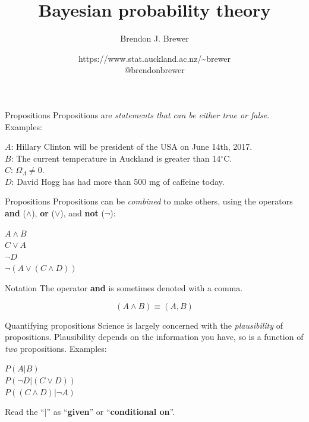 \documentclass{beamer}
\author{Brendon J. Brewer}
\title{Bayesian probability theory}
\institute{Department of Statistics, The University of Auckland}
\date{{\color{blue} https://www.stat.auckland.ac.nz/\~{ }brewer}\\
\vspace{10pt}
{\color{blue} @brendonbrewer}}
\begin{document}
\begin{frame}[t,plain]
\titlepage
\end{frame}

\begin{frame}[t]{Propositions}
Propositions are {\it statements that can be either true or false}.\\
Examples:\vspace{20pt}

$A$: {\small Hillary Clinton will be president of the USA on June 14th, 2017.}\\
$B$: {\small The current temperature in Auckland is greater than 14$^{\circ}$C.}\\
$C$: {\small $\Omega_\Lambda \neq 0$.}\\
$D$: {\small David Hogg has had more than 500 mg of caffeine today.}
\end{frame}

\begin{frame}[t]{Propositions}
Propositions can be {\it combined} to make others, using the operators
{\bf and} ($\wedge$), {\bf or} ($\vee$), and {\bf not} ($\neg$): \vspace{20pt}

$A \wedge B$\\
$C \vee A$\\
$\neg D$\\
$\neg (A \vee (C \wedge D))$
\end{frame}

\begin{frame}[t]{Notation}
The operator {\bf and} is sometimes denoted with a comma.\vspace{20pt}

\begin{equation}
(A \wedge B) \equiv (A, B)
\end{equation}

\end{frame}

\begin{frame}[t]{Quantifying propositions}
Science is largely concerned with the {\it plausibility} of propositions.
Plausibility depends on the information you have, so is a function of {\it
two} propositions. Examples:\vspace{20pt}

$P(A | B)$\\
$P(\neg D | (C \vee D))$\\
$P((C \wedge D) | \neg A)$\vspace{20pt}

Read the ``$|$'' as ``{\bf given}'' or ``{\bf conditional on}''.
\end{frame}
\end{document}
